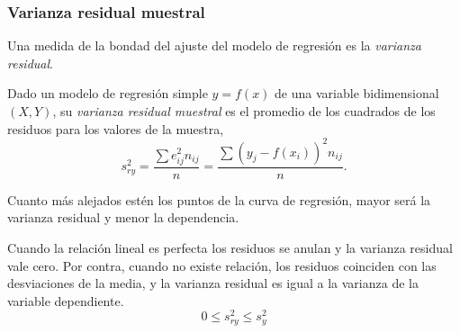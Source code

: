 \begin{frame}
\frametitle{Varianza residual muestral}
Una medida de la bondad del ajuste del modelo de regresión es la \emph{varianza residual}.
\begin{definicion}
Dado un modelo de regresión simple $y=f(x)$ de una variable bidimensional $(X,Y)$, su \emph{varianza residual muestral} es el promedio de los cuadrados de los residuos para los valores de la muestra,
\[
s_{ry}^2 = \frac{\sum e_{ij}^2n_{ij}}{n} = \frac{\sum (y_j - f(x_i))^2n_{ij}}{n}.
\]
\end{definicion}
Cuanto más alejados estén los puntos de la curva de regresión, mayor será la varianza residual y menor la dependencia.

Cuando la relación lineal es perfecta los residuos se anulan y la varianza residual vale cero. 
Por contra, cuando no existe relación, los residuos coinciden con las desviaciones de la media, y la varianza residual es igual a la varianza de la variable dependiente.
\[
0\leq s_{ry}^2\leq s_y^2
\]

\end{frame}


